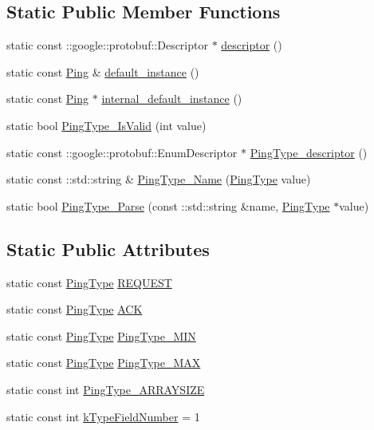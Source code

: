 \subsection*{Static Public Member Functions}
\begin{DoxyCompactItemize}
\item 
static const \+::google\+::protobuf\+::\+Descriptor $\ast$ \hyperlink{class_ping_affae912cb3b5bdd0e325608caf3f8393}{descriptor} ()
\item 
static const \hyperlink{class_ping}{Ping} \& \hyperlink{class_ping_a13fd7ef9ce8b0a95ecb2a90cbe39588d}{default\+\_\+instance} ()
\item 
static const \hyperlink{class_ping}{Ping} $\ast$ \hyperlink{class_ping_a2d8195a2aff9e1014459165c746ce0cf}{internal\+\_\+default\+\_\+instance} ()
\item 
static bool \hyperlink{class_ping_a2f1593826300acf569d271fc154e4dfb}{Ping\+Type\+\_\+\+Is\+Valid} (int value)
\item 
static const \+::google\+::protobuf\+::\+Enum\+Descriptor $\ast$ \hyperlink{class_ping_ad4eba58aec17e81412a93b0c26c2bb34}{Ping\+Type\+\_\+descriptor} ()
\item 
static const \+::std\+::string \& \hyperlink{class_ping_ada302defbb1fdd35a518617dc692c634}{Ping\+Type\+\_\+\+Name} (\hyperlink{ping_8pb_8h_a4b13f38feb620891e72b30e36aaaf35b}{Ping\+Type} value)
\item 
static bool \hyperlink{class_ping_ac60f2ebb8db368703d2c7a44bb440373}{Ping\+Type\+\_\+\+Parse} (const \+::std\+::string \&name, \hyperlink{ping_8pb_8h_a4b13f38feb620891e72b30e36aaaf35b}{Ping\+Type} $\ast$value)
\end{DoxyCompactItemize}
\subsection*{Static Public Attributes}
\begin{DoxyCompactItemize}
\item 
static const \hyperlink{ping_8pb_8h_a4b13f38feb620891e72b30e36aaaf35b}{Ping\+Type} \hyperlink{class_ping_a2735b67ccf99a4ef4ea8f9d77833046c}{R\+E\+Q\+U\+E\+ST}
\item 
static const \hyperlink{ping_8pb_8h_a4b13f38feb620891e72b30e36aaaf35b}{Ping\+Type} \hyperlink{class_ping_a5b6701609d0a2d04eccffd28ace8f44e}{A\+CK}
\item 
static const \hyperlink{ping_8pb_8h_a4b13f38feb620891e72b30e36aaaf35b}{Ping\+Type} \hyperlink{class_ping_aaae3c5a8ba3a462447872d8e64495b4f}{Ping\+Type\+\_\+\+M\+IN}
\item 
static const \hyperlink{ping_8pb_8h_a4b13f38feb620891e72b30e36aaaf35b}{Ping\+Type} \hyperlink{class_ping_a87cbddfca662688ece18233d43782221}{Ping\+Type\+\_\+\+M\+AX}
\item 
static const int \hyperlink{class_ping_a8028a954d7d78d13fae083cb60e727b0}{Ping\+Type\+\_\+\+A\+R\+R\+A\+Y\+S\+I\+ZE}
\item 
static const int \hyperlink{class_ping_a2ec16d3d988ff75ef9da99ae2bb1ec66}{k\+Type\+Field\+Number} = 1
\end{DoxyCompactItemize}
